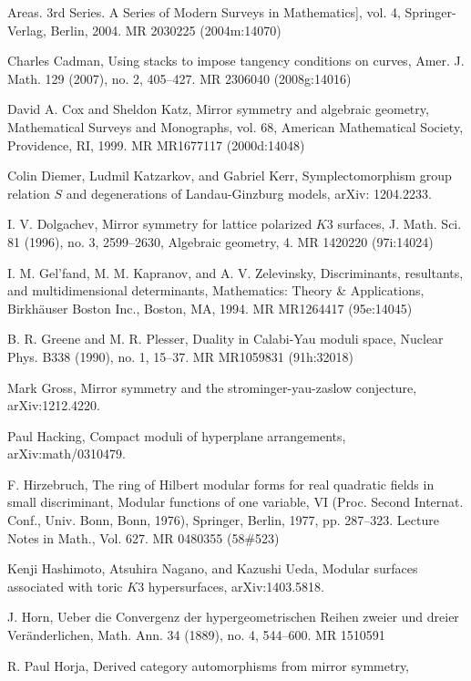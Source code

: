 \begin{list}{}{%
  \setlength{\leftmargin}{5.4em}%
  \setlength{\labelwidth}{4.8em}%
  \setlength{\labelsep}{0.6em}%
  \setlength{\itemsep}{1.5pt}%
  \setlength{\parsep}{0pt}}
  Areas. 3rd Series. A Series of Modern Surveys in Mathematics], vol. 4, Springer-Verlag,
  Berlin, 2004. MR 2030225 (2004m:14070)
\item[{[Cad07]}] Charles Cadman, Using stacks to impose tangency conditions on curves,
  Amer. J. Math. 129 (2007), no. 2, 405–427. MR 2306040 (2008g:14016)
\item[{[CK99]}] David A. Cox and Sheldon Katz, Mirror symmetry and algebraic geometry,
  Mathematical Surveys and Monographs, vol. 68, American Mathematical Society, Providence,
  RI, 1999. MR MR1677117 (2000d:14048)
\item[{[DKK]}] Colin Diemer, Ludmil Katzarkov, and Gabriel Kerr, Symplectomorphism group
  relation $S$ and degenerations of Landau-Ginzburg models, arXiv: 1204.2233.
\item[{[Dol96]}] I. V. Dolgachev, Mirror symmetry for lattice polarized $K3$ surfaces,
  J. Math. Sci. 81 (1996), no. 3, 2599–2630, Algebraic geometry, 4. MR 1420220 (97i:14024)
\item[{[GKZ94]}] I. M. Gel'fand, M. M. Kapranov, and A. V. Zelevinsky, Discriminants,
  resultants, and multidimensional determinants, Mathematics: Theory \& Applications,
  Birkh\"auser Boston Inc., Boston, MA, 1994. MR MR1264417 (95e:14045)
\item[{[GP90]}] B. R. Greene and M. R. Plesser, Duality in Calabi-Yau moduli space,
  Nuclear Phys. B338 (1990), no. 1, 15–37. MR MR1059831 (91h:32018)
\item[{[Gro]}] Mark Gross, Mirror symmetry and the strominger-yau-zaslow conjecture,
  arXiv:1212.4220.
\item[{[Hac]}] Paul Hacking, Compact moduli of hyperplane arrangements, arXiv:math/0310479.
\item[{[Hir77]}] F. Hirzebruch, The ring of Hilbert modular forms for real quadratic fields
  in small discriminant, Modular functions of one variable, VI (Proc. Second Internat. Conf.,
  Univ. Bonn, Bonn, 1976), Springer, Berlin, 1977, pp. 287–323. Lecture Notes in Math.,
  Vol. 627. MR 0480355 (58\#523)
\item[{[HNU]}] Kenji Hashimoto, Atsuhira Nagano, and Kazushi Ueda, Modular surfaces
  associated with toric $K3$ hypersurfaces, arXiv:1403.5818.
\item[{[Hor89]}] J. Horn, Ueber die Convergenz der hypergeometrischen Reihen zweier und
  dreier Ver\"anderlichen, Math. Ann. 34 (1889), no. 4, 544–600. MR 1510591
\item[{[Hor05]}] R. Paul Horja, Derived category automorphisms from mirror symmetry,

\end{list}
